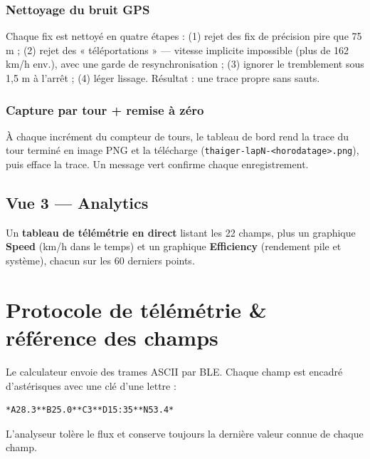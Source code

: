 \documentclass[11pt,a4paper,oneside]{report}
\newcommand{\code}[1]{\texttt{#1}}
\begin{document}
\subsubsection{Nettoyage du bruit GPS}
Chaque fix est nettoyé en quatre étapes : (1) rejet des fix de précision pire que
75 m ; (2) rejet des « téléportations » --- vitesse implicite impossible (plus de
162 km/h env.), avec une garde de resynchronisation ; (3) ignorer le tremblement
sous 1,5 m à l'arrêt ; (4) léger lissage. Résultat : une trace propre sans sauts.

\subsubsection{Capture par tour + remise à zéro}
À chaque incrément du compteur de tours, le tableau de bord rend la trace du tour
terminé en image PNG et la télécharge
(\code{thaiger-lapN-<horodatage>.png}), puis efface la trace. Un message vert
confirme chaque enregistrement.

\subsection{Vue 3 --- Analytics}
Un \textbf{tableau de télémétrie en direct} listant les 22 champs, plus un graphique
\textbf{Speed} (km/h dans le temps) et un graphique \textbf{Efficiency} (rendement
pile et système), chacun sur les 60 derniers points.

\section{Protocole de télémétrie \& référence des champs}
Le calculateur envoie des trames ASCII par BLE. Chaque champ est encadré
d'astérisques avec une clé d'une lettre :

\begin{lstlisting}
*A28.3**B25.0**C3**D15:35**N53.4*
\end{lstlisting}
L'analyseur tolère le flux et conserve toujours la dernière valeur connue de chaque
champ.
\end{document}
